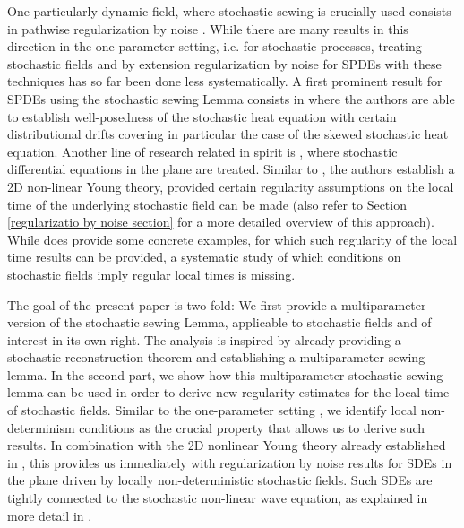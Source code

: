 \documentclass[11pt,oneside,english,reqno]{amsart}
\numberwithin{equation}{section}
\numberwithin{figure}{section}
\theoremstyle{plain}
\theoremstyle{definition}
\theoremstyle{remark}
\theoremstyle{plain}
\theoremstyle{plain}
\theoremstyle{plain}
\theoremstyle{plain}
\theoremstyle{plain}
\begin{document}
\bigskip

One particularly dynamic field, where stochastic sewing is crucially used consists in pathwise regularization by noise \cite{galeati2020noiseless, harang2020cinfinity, galeatiharang,particlesystems,catellierharang,catellier2,dareiotis,gerencsergal,lukasz,Galeati2022,galeati2,tolomeo, toyomu, butkovsky2023stochastic, bechtold}. While there are many results in this direction in the one parameter setting, i.e. for stochastic processes, treating stochastic fields and by extension regularization by noise for SPDEs with these techniques has so far been done less systematically. A first prominent result for SPDEs using the stochastic sewing Lemma consists in \cite{athreya2022wellposedness} where the authors are able to establish well-posedness of the stochastic heat equation with certain distributional drifts covering in particular the case of the skewed stochastic heat equation. Another line of research related in spirit is \cite{Bechtold2023}, where stochastic differential equations in the plane are treated. Similar to \cite{harang2020cinfinity}, the authors establish a 2D non-linear Young theory, provided certain regularity assumptions on the local time of the underlying stochastic field can be made (also refer to Section \ref{regularizatio by noise section} for a more detailed overview of this approach). While \cite{Bechtold2023} does provide some concrete examples, for which such regularity of the local time results can be provided, a systematic study of which conditions on stochastic fields imply regular local times is missing.

\bigskip

The goal of the present paper is two-fold: We first provide a multiparameter version of the stochastic sewing Lemma, applicable to stochastic fields and of interest in its own right. The analysis is inspired by \cite{kern2023stochastic} already providing a stochastic reconstruction theorem and \cite{Harang2021} establishing a multiparameter sewing lemma. In the second part, we show how this multiparameter stochastic sewing lemma can be used in order to derive new regularity estimates for the local time of stochastic fields. Similar to the one-parameter setting \cite{harang2020cinfinity}, we identify local non-determinism conditions as the crucial property that allows us to derive such results. In combination with the 2D nonlinear Young theory already established in \cite{Bechtold2023}, this provides us immediately with regularization by noise results for SDEs in the plane driven by locally non-deterministic stochastic fields. Such SDEs are tightly connected to the stochastic non-linear wave equation, as explained in more detail in \cite{Bechtold2023}.
\end{document}
